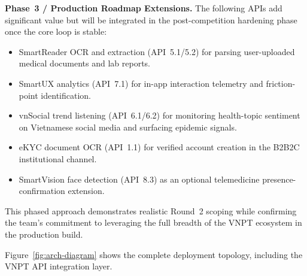 \begin{itemize}[leftmargin=2em, itemsep=2pt, topsep=4pt]
        \textbf{Phase~3 / Production Roadmap Extensions.}
        The following APIs add significant value but will be integrated
        in the post-competition hardening phase once the core loop is
        stable:
        \begin{itemize}[leftmargin=3em, itemsep=1pt, topsep=2pt]
          \item SmartReader OCR and extraction (API~5.1/5.2) for
                parsing user-uploaded medical documents and lab reports.
          \item SmartUX analytics (API~7.1) for in-app interaction
                telemetry and friction-point identification.
          \item vnSocial trend listening (API~6.1/6.2) for monitoring
                health-topic sentiment on Vietnamese social media and
                surfacing epidemic signals.
          \item eKYC document OCR (API~1.1) for verified account
                creation in the B2B2C institutional channel.
          \item SmartVision face detection (API~8.3) as an optional
                telemedicine presence-confirmation extension.
        \end{itemize}

        This phased approach demonstrates realistic Round~2 scoping while
        confirming the team's commitment to leveraging the full breadth of
        the VNPT ecosystem in the production build.
\end{itemize}

Figure~\ref{fig:arch-diagram} shows the complete deployment topology,
including the VNPT API integration layer.

